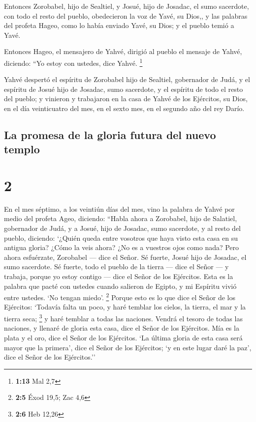  Entonces Zorobabel, hijo de Sealtiel, y Josué, hijo de
Josadac, el sumo sacerdote, con todo el resto del pueblo, obedecieron la
voz de Yavé, su Dios,, y las palabras del profeta Hageo, como lo había
enviado Yavé, su Dios; y el pueblo temió a Yavé.

 Entonces Hageo, el mensajero de Yahvé, dirigió al pueblo
el mensaje de Yahvé, diciendo: ``Yo estoy con ustedes, dice Yahvé.
\footnote{\textbf{1:13} Mal 2,7}

 Yahvé despertó el espíritu de Zorobabel hijo de
Sealtiel, gobernador de Judá, y el espíritu de Josué hijo de Josadac,
sumo sacerdote, y el espíritu de todo el resto del pueblo; y vinieron y
trabajaron en la casa de Yahvé de los Ejércitos, su Dios,
 en el día veinticuatro del mes, en el sexto mes, en el
segundo año del rey Darío.

\hypertarget{la-promesa-de-la-gloria-futura-del-nuevo-templo}{%
\subsection{La promesa de la gloria futura del nuevo
templo}\label{la-promesa-de-la-gloria-futura-del-nuevo-templo}}

\hypertarget{section-1}{%
\section{2}\label{section-1}}

 En el mes séptimo, a los veintiún días del mes, vino la
palabra de Yahvé por medio del profeta Ageo, diciendo: 
``Habla ahora a Zorobabel, hijo de Salatiel, gobernador de Judá, y a
Josué, hijo de Josadac, sumo sacerdote, y al resto del pueblo, diciendo:
 `¿Quién queda entre vosotros que haya visto esta casa en
su antigua gloria? ¿Cómo la veis ahora? ¿No es a vuestros ojos como
nada?  Pero ahora esfuérzate, Zorobabel --- dice el Señor.
Sé fuerte, Josué hijo de Josadac, el sumo sacerdote. Sé fuerte, todo el
pueblo de la tierra --- dice el Señor --- y trabaja, porque yo estoy
contigo --- dice el Señor de los Ejércitos.  Esta es la
palabra que pacté con ustedes cuando salieron de Egipto, y mi Espíritu
vivió entre ustedes. `No tengan miedo'. \footnote{\textbf{2:5} Éxod
  19,5; Zac 4,6}  Porque esto es lo que dice el Señor de
los Ejércitos: `Todavía falta un poco, y haré temblar los cielos, la
tierra, el mar y la tierra seca; \footnote{\textbf{2:6} Heb 12,26}
 y haré temblar a todas las naciones. Vendrá el tesoro de
todas las naciones, y llenaré de gloria esta casa, dice el Señor de los
Ejércitos.  Mía es la plata y el oro, dice el Señor de los
Ejércitos.  `La última gloria de esta casa será mayor que
la primera', dice el Señor de los Ejércitos; `y en este lugar daré la
paz', dice el Señor de los Ejércitos.''

